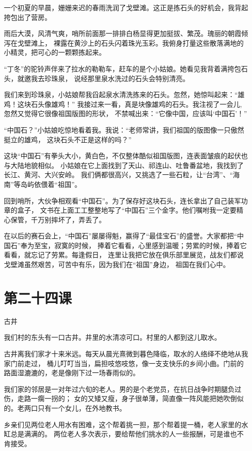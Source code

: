 \documentclass[12pt,UTF8]{ctexbook}
\begin{document}
一个初夏的早晨，姗姗来迟的春雨洗润了戈壁滩。这正是拣石头的好机会，我背起挎包出了营房。

雨后大漠，风清气爽，哨所前面那一排排白杨显得更加挺拔、繁茂。瑰丽的朝霞倾泻在戈壁滩上，
裸露在黄沙上的石头闪着珠光玉彩。我俯身打量这些散落满地的小精灵，把可心的一颗颗拣起来。

“丁冬”的驼铃声伴来了拉水的勒勒车，赶车的是个小姑娘。她看见我背着满挎包石头，就邀我去珍珠泉，
说经那里泉水洗过的石头会特别清亮。

我们来到珍珠泉，小姑娘帮我舀起泉水清洗拣来的石头。忽然，她惊叫起来：“雄鸡！这块石头像雄鸡！”
我接过来一看，真是块像雄鸡的石头。我注视了一会儿,忽然又觉得它很像祖国版图的形状，
不禁喊出来：“它像中国，应该叫‘中国石’！”

“中国石？”小姑娘吃惊地看着我。我说：“老师常讲，我们祖国的版图像一只傲然挺立的雄鸡，
这块石头不正是这样的吗？”

这块“中国石”有拳头大小，黄白色，不仅整体酷似祖国版图，连表面皱痕的起伏也与大陆地貌相似。
小姑娘在它上面找到了天山、祁连山、吐鲁番盆地，我找到了长江、黄河、大兴安岭。
我们俩都很高兴，又挑选了一些石粒，让“台湾”、“海南”等岛屿依偎着“祖国”。

回到哨所，大伙争相观看“中国石”。为了保存好这块石头，连长拿出了自己装军功章的盒子，
文书在上面工工整整地写了“中国石”三个金字。他们嘱咐我一定要精心保管，千万别摔坏了，弄丢了。

在以后的赛石会上，“中国石”屡屡得魁，赢得了“最佳宝石”的盛誉。大家都把“中国石”奉为至宝，寂寞的时候，
捧着它看看，心里感到温暖；劳累的时候，捧着它看看，就忘记了劳累。每逢假日，
连里让我把它放在俱乐部里展览，战友们都说戈壁滩虽然艰苦，可苦中有乐，因为我们在“祖国”身边，
祖国在我们心中。

\section{第二十四课}

古井

我们村的东头有一口古井。井里的水清凉可口。村里的人都到这儿取水。

古井离我们家才十来米远。每天从晨光熹微到暮色降临，取水的人络绎不绝地从我家门前走过，
桶儿叮叮当当，扁担吱悠吱悠，像一支支快乐的乡间小曲。门前的路面湿漉漉的，老是像刚下过一场春雨似的。

我们家的邻居是一对年过六旬的老人。男的是个老党员，在抗日战争时期腿负过伤，走路一瘸一拐的；
女的又矮又瘦，身子很单薄，简直像一阵风能把她吹倒似的。老两口只有一个女儿，在外地教书。

乡亲们见两位老人用水有困难，这个帮着挑一担，那个帮着提一桶，老人家里的水缸总是满满的。
两位老人多次表示，要给帮他们挑水的人一些报酬，可是谁也不肯接受。
\end{document}
